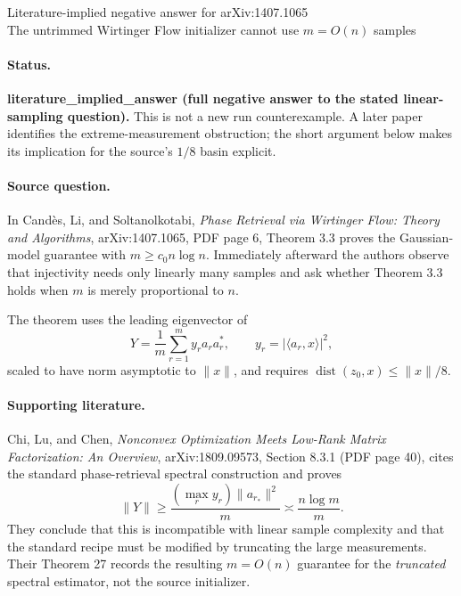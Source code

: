 \documentclass[11pt]{article}
\begin{document}
\begin{center}
{\Large Literature-implied negative answer for arXiv:1407.1065}\\[4pt]
{\large The untrimmed Wirtinger Flow initializer cannot use $m=O(n)$ samples}
\end{center}

\paragraph{Status.}
\textbf{literature\_implied\_answer (full negative answer to the stated
linear-sampling question).}  This is not a new run counterexample.  A later
paper identifies the extreme-measurement obstruction; the short argument
below makes its implication for the source's $1/8$ basin explicit.

\paragraph{Source question.}
In Cand\`es, Li, and Soltanolkotabi, \emph{Phase Retrieval via Wirtinger Flow:
Theory and Algorithms}, arXiv:1407.1065, PDF page 6, Theorem 3.3 proves the
Gaussian-model guarantee with $m\geq c_0n\log n$.  Immediately afterward the
authors observe that injectivity needs only linearly many samples and ask
whether Theorem 3.3 holds when $m$ is merely proportional to $n$.

The theorem uses the leading eigenvector of
\[
 Y=\frac1m\sum_{r=1}^m y_ra_ra_r^*,\qquad
 y_r=|\langle a_r,x\rangle|^2,                                      \tag{1}
\]
scaled to have norm asymptotic to $\|x\|$, and requires
$\operatorname{dist}(z_0,x)\leq\|x\|/8$.

\paragraph{Supporting literature.}
Chi, Lu, and Chen, \emph{Nonconvex Optimization Meets Low-Rank Matrix
Factorization: An Overview}, arXiv:1809.09573, Section 8.3.1 (PDF page 40),
cites the standard phase-retrieval spectral construction and proves
\[
 \|Y\|\geq \frac{(\max_r y_r)\|a_{r_*}\|^2}{m}
       \asymp \frac{n\log m}{m}.                                    \tag{2}
\]
They conclude that this is incompatible with linear sample complexity and
that the standard recipe must be modified by truncating the large
measurements.  Their Theorem 27 records the resulting $m=O(n)$ guarantee for
the \emph{truncated} spectral estimator, not the source initializer.
\end{document}
